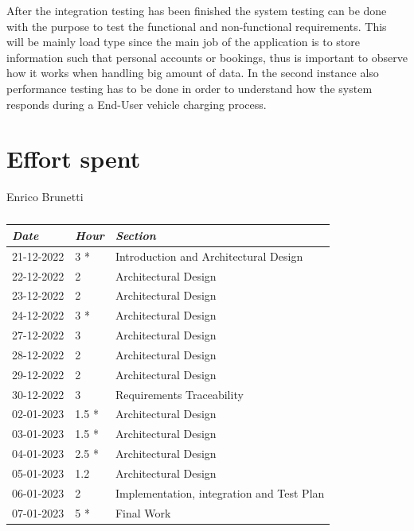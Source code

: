 \documentclass[a4paper]{report}
\begin{document}
After the integration testing has been finished the system testing can be done with the purpose to test the functional and non-functional requirements. This will be mainly load type since the main job of the application is to store information such that personal accounts or bookings, thus is important to observe how it works when handling big amount of data. In the second instance also performance testing has to be done in order to understand how the system responds during a End-User vehicle charging process.
\chapter{Effort spent}
\begin{table}[H]
\centering

Enrico Brunetti\\
\begin{tabular}{p{2cm}p{1.5cm}p{7cm}}
\toprule
\textit{Date} & \textit{Hour} & \textit{Section} \\ \midrule
21-12-2022 & 3 * & Introduction and Architectural Design \\ \midrule
22-12-2022 & 2 &  Architectural Design\\ \midrule
23-12-2022 & 2 &  Architectural Design\\ \midrule
24-12-2022 & 3 * & Architectural Design \\ \midrule
27-12-2022 & 3 & Architectural Design \\ \midrule
28-12-2022 & 2 & Architectural Design \\ \midrule
29-12-2022 & 2 & Architectural Design \\ \midrule
30-12-2022 & 3 & Requirements Traceability \\ \midrule
02-01-2023 & 1.5 * & Architectural Design \\ \midrule
03-01-2023 & 1.5 * & Architectural Design \\ \midrule
04-01-2023 & 2.5 * & Architectural Design \\  \midrule
05-01-2023 & 1.2 &  Architectural Design \\  \midrule
06-01-2023 & 2 & Implementation, integration and Test Plan \\ \midrule
07-01-2023 & 5 * & Final Work \\ \midrule

\bottomrule
\end{tabular}
\caption[Enrico Brunetti's effort table]{}
\end{table}
\end{document}
